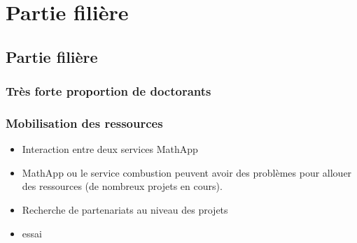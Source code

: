 \renewcommand\evenpagerightmark{{\scshape\small Filière Work for Centrale}}
\chapter[Partie filière]%
{Partie filière}
\label{Partie filière}

\section{Partie filière}

\subsection{Très forte proportion de doctorants}

\subsection{Mobilisation des ressources}
\begin{itemize}


\item Interaction entre deux services MathApp
\item MathApp ou le service combustion peuvent avoir des problèmes pour allouer des ressources (de nombreux projets en cours).
\item Recherche de partenariats au niveau des projets
\item essai
\end{itemize}